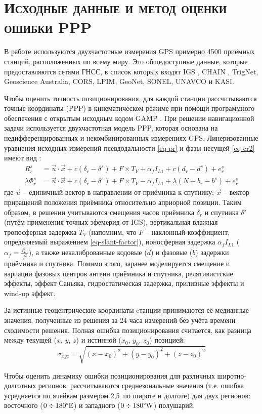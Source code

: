 \section{\textsc{Исходные данные и метод оценки ошибки PPP}}

В работе используются двухчастотные измерения GPS примерно 4500 приёмных станций, расположенных по всему миру.
Это общедоступные данные, которые предоставляются сетями ГНСС, в список которых входят IGS \cite{Dow2009}, CHAIN \cite{Jayachandran2009}, TrigNet, Geoscience Australia, CORS, LPIM, GeoNet, SONEL, UNAVCO и KASI.

Чтобы оценить точность позиционирования, для каждой станции рассчитываются точные координаты (PPP) в кинематическом режиме при помощи программного обеспечения с открытым исходным кодом GAMP \cite{Zhou2018}. 
При решении навигационной задачи используется двухчастотная модель PPP, которая основана на недифференцированных и некомбинированных измерениях GPS.
Линеризованные уравнения исходных измерений псевдодальности \eqref{eq-pr} и фазы несущей \eqref{eq-cr2} имеют вид \cite{Zhou2018}:
\begin{equation}
\begin{aligned}
R_r^s&=\vec{u}\cdot\vec{x}+c(\delta_r-\delta^s)+F\times T_V+\alpha_fI_{L1}+c(d_r-d^s)+e_r^s \\
\lambda\Phi_r^s&=\vec{u}\cdot\vec{x}+c(\delta_r-\delta^s)+F\times T_V-\alpha_fI_{L1}+\lambda(N+b_r-b^s)+e_r^s
\end{aligned}
\end{equation}  
где 
$\vec{u}$ -- единичный вектор в направлении от приёмника к спутнику; 
$\vec{x}$ -- вектор приращений положения приёмника относительно априорной позиции.
Таким образом, в решении учитываются смещения часов приёмника $\delta_r$ и спутника $\delta^s$ (путём применения точных эфемерид от IGS), вертикальная влажная тропосферная задержка $T_V$ (напомним, что $F$ -- наклонный коэффициент, определяемый выражением \eqref{eq-slant-factor}), ионосферная задержка $\alpha_fI_{L1}$ ($\alpha_f=\frac{f_{L1}^2}{f^2}$), а также некалиброванные кодовые ($d$) и фазовые ($b$) задержки приёмника и спутника.   
Помимо этого, заранее моделируется смещение и вариации фазовых центров антенн приёмника и спутника, релятивистские эффекты, эффект Саньяка, гидростатическая задержка, приливные эффекты и wind-up эффект.

За истинные геоцентрические координаты cтанции принимаются её медианные значения, полученные из решения за 24 часа измерений без учёта времени сходимости решения.
Полная ошибка позиционирования считается, как разница между текущей ($x$, $y$, $z$) и истинной ($x_0$, $y_0$, $z_0$) позицией:
\begin{equation}
\sigma_{xyz}=\sqrt{(x-x_0)^2+(y-y_0)^2+(z-z_0)^2}
\label{eq-3d-error}
\end{equation}

Чтобы оценить динамику ошибки позиционирования для различных широтно-долготных регионов, рассчитываются среднезональные значения (т.е. ошибка усредняется по ячейкам размером 2,5\degree~по широте и долготе) для двух регионов: восточного ($0\div180\degree \text{E}$) и западного ($0\div180\degree \text{W}$) полушарий.  